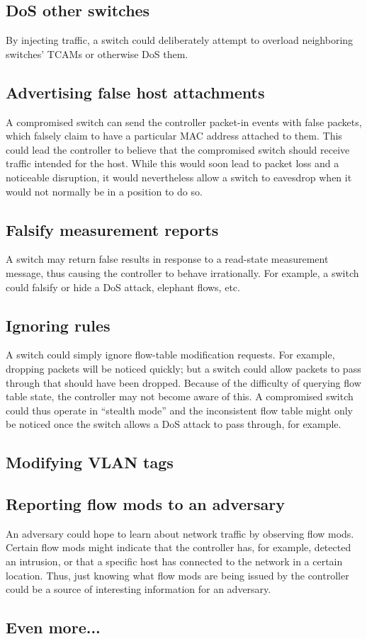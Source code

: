 \subsection{DoS other switches}
By injecting traffic, a switch could deliberately attempt to overload neighboring switches’ TCAMs or otherwise DoS them.





\subsection{Advertising false host attachments}
A compromised switch can send the controller packet-in events with false packets, which falsely claim to have a particular MAC address attached to them. This could lead the controller to believe that the compromised switch should receive traffic intended for the host. While this would soon lead to packet loss and a noticeable disruption, it would nevertheless allow a switch to eavesdrop when it would not normally be in a position to do so.

\subsection{Falsify measurement reports}
A switch may return false results in response to a read-state  measurement message, thus causing the controller to behave irrationally. For example, a switch could falsify or hide a DoS attack, elephant flows, etc.

\subsection{Ignoring rules}
A switch could simply ignore flow-table modification requests. For example, dropping packets will be noticed quickly; but a switch could allow packets to pass through that should have been dropped. Because of the difficulty of querying flow table state, the controller may not become aware of this. A compromised switch could thus operate in “stealth mode” and the inconsistent flow table might only be noticed once the switch allows a DoS attack to pass through, for example.

\subsection{Modifying VLAN tags}

\subsection{Reporting flow mods to an adversary}
An adversary could hope to learn about network traffic by observing flow mods. Certain flow mods might indicate that the controller has, for example, detected an intrusion, or that a specific host has connected to the network in a certain location. Thus, just knowing what flow mods are being issued by the controller could be a source of interesting information for an adversary.

\subsection{Even more...}
